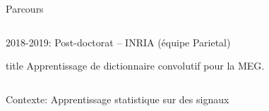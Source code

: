 \documentclass{beamer}
\def\myitem{\hskip1ex{\color{linkcolor} $\blacktriangleright$}\hskip.3em}
\begin{document}
\begin{frame}[t]{Parcours}
\begin{columns}[c]
\begin{list}{}{\leftmargin=0em \itemsep=1em}
\begin{columns}[T]
        \end{columns}
        
        \item 2018-2019: Post-doctorat -- INRIA (équipe Parietal)
        \begin{beamercolorbox}[rounded=true, shadow=true]{title}
            Apprentissage de dictionnaire convolutif pour la MEG.\\
        \end{beamercolorbox}
    \end{list}
\end{columns}

\end{frame}


\begin{frame}[t]{Contexte: Apprentissage statistique sur des signaux}

{
\centering
{}\\
}

\end{frame}
\end{document}
